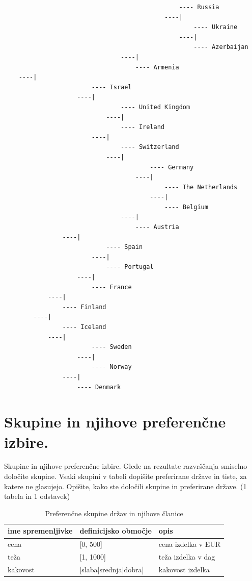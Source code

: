 \documentclass[a4paper,11pt]{article}
\begin{document}
\begin{lstlisting}
                                                ---- Russia
                                            ----|
                                                    ---- Ukraine
                                                ----|
                                                    ---- Azerbaijan
                                ----|
                                    ---- Armenia
    ----|
                        ---- Israel
                    ----|
                                ---- United Kingdom
                            ----|
                                ---- Ireland
                        ----|
                                ---- Switzerland
                            ----|
                                        ---- Germany
                                    ----|
                                            ---- The Netherlands
                                        ----|
                                            ---- Belgium
                                ----|
                                    ---- Austria
                ----|
                            ---- Spain
                        ----|
                            ---- Portugal
                    ----|
                        ---- France
            ----|
                ---- Finland
        ----|
                ---- Iceland
            ----|
                        ---- Sweden
                    ----|
                        ---- Norway
                ----|
                    ---- Denmark
\end{lstlisting}


\section{Skupine in njihove preferenčne izbire.}
Skupine in njihove preferenčne izbire. Glede na rezultate razvrščanja smiselno določite skupine. Vsaki skupini v tabeli dopišite preferirane države in tiste, za katere ne glasujejo. Opišite, kako ste določili skupine in preferirane države. (1 tabela in 1 odstavek)

\begin{table}[htbp]
\caption{Preferenčne skupine držav in njihove članice}
\label{tab1}
\begin{center}
\begin{tabular}{llp{3cm}}
\hline
ime spremenljivke & definicijsko območje & opis \\
\hline
cena & [0, 500] & cena izdelka v EUR\\
teža & [1, 1000] & teža izdelka v dag \\
kakovost & [slaba|srednja|dobra] & kakovost izdelka \\
\hline
\end{tabular}
\end{center}
\end{table}
\end{document}
